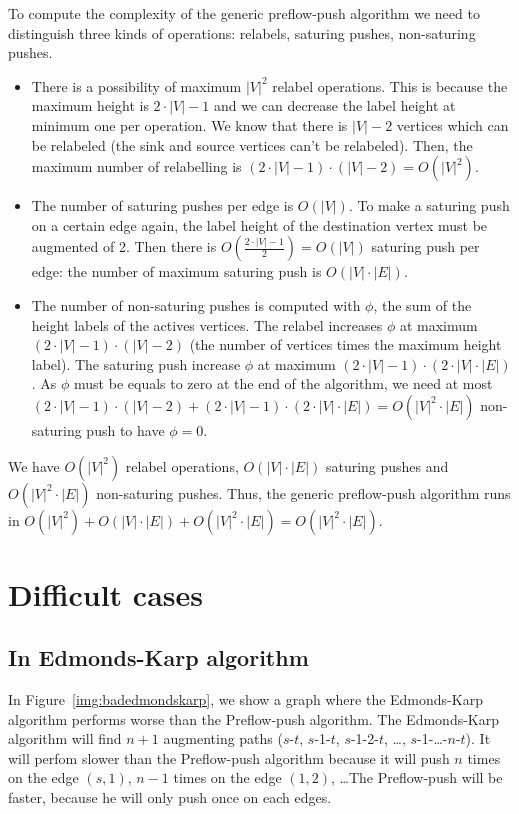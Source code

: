 To compute the complexity of the generic preflow-push algorithm we need to distinguish three kinds of operations: relabels, saturing pushes, non-saturing pushes.
\begin{itemize}
\item There is a possibility of maximum $|V|^2$ relabel operations. This is because the maximum height is $2\cdot |V| - 1$ and we can decrease the label height at minimum one per operation. We know that there is $|V| - 2$ vertices which can be relabeled (the sink and source vertices can't be relabeled). Then, the maximum number of relabelling is $(2\cdot |V| - 1) \cdot (|V| - 2) = O(|V|^2)$.

\item The number of saturing pushes per edge is $O(|V|)$. To make a saturing push on a certain edge again, the label height of the destination vertex must be augmented of 2. Then there is $O(\frac{2\cdot |V| - 1}{2}) = O(|V|)$ saturing push per edge: the number of maximum saturing push is $O(|V|\cdot |E|)$.

\item The number of non-saturing pushes is computed with $\phi$, the sum of the height labels of the actives vertices. The relabel increases $\phi$ at maximum $(2\cdot |V| - 1)\cdot (|V|-2)$ (the number of vertices times the maximum height label). The saturing push increase $\phi$ at maximum $(2\cdot |V|-1)\cdot (2\cdot |V|\cdot |E|)$. As $\phi$ must be equals to zero at the end of the algorithm, we need at most $(2\cdot |V|-1)\cdot (|V|-2) + (2\cdot |V|-1)\cdot (2\cdot |V|\cdot |E|) = O(|V|^2\cdot |E|)$ non-saturing push to have $\phi = 0$.
\end{itemize}
We have $O(|V|^2)$ relabel operations, $O(|V|\cdot |E|)$ saturing pushes and $O(|V|^2\cdot |E|)$ non-saturing pushes. Thus, the generic preflow-push algorithm runs in $O(|V|^2) + O(|V|\cdot |E|) + O(|V|^2\cdot |E|) = O(|V|^2 \cdot |E|)$. 

\section{Difficult cases}

\subsection{In Edmonds-Karp algorithm}

In Figure~\ref{img:badedmondskarp}, we show a graph where the Edmonds-Karp algorithm performs worse than the Preflow-push algorithm.  The Edmonds-Karp algorithm will find $n+1$ augmenting paths ($s$-$t$, $s$-1-$t$, $s$-1-2-$t$, \dots, $s$-1-\dots-$n$-$t$). It will perfom slower than the Preflow-push algorithm because it will push $n$ times on the edge $(s, 1)$, $n-1$ times on the edge $(1, 2)$, \dots The Preflow-push will be faster, because he will only push once on each edges.

